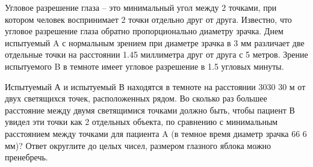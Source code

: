 
Угловое
разрешение глаза – это минимальный угол между 2 точками, при котором человек
воспринимает 2 точки отдельно друг от друга. Известно, что угловое разрешение
глаза обратно пропорционально диаметру зрачка. Днем испытуемый A с нормальным
зрением при диаметре зрачка в 3  мм различает две отдельные точки на расстоянии
1.45  миллиметра друг от друга с 5  метров. Зрение испытуемого B в темноте имеет
угловое разрешение в 1.5  угловых минуты. 

Испытуемый А и испытуемый В находятся в темноте на расстоянии
3030 30  м от двух светящихся точек, расположенных рядом.  Во сколько раз большее расстояние между двумя
светящимися точками должно быть, чтобы пациент В увидел эти точки как 2
отдельных объекта, по сравнению с минимальным расстоянием между точками для
пациента A (в темное время диаметр зрачка 66 6  мм)? Ответ округлите до целых
чисел, размером глазного яблока можно пренебречь.

